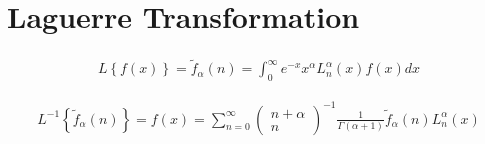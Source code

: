 %
%
%
\section{Laguerre Transformation
\label{laguerre:section:transformation}}
\begin{align}
    L \left\{ f(x) \right\}
    =
    \tilde{f}_\alpha(n)
    =
    \int_0^\infty e^{-x} x^\alpha L_n^\alpha(x) f(x) dx
    \label{laguerre:transformation}
\end{align}

\begin{align}
    L^{-1} \left\{ \tilde{f}_\alpha(n) \right\}
    =
    f(x)
    =
    \sum_{n=0}^{\infty} 
    \begin{pmatrix}
        n + \alpha \\
        n
    \end{pmatrix}^{-1}
    \frac{1}{\Gamma(\alpha + 1)}
    \tilde{f}_\alpha(n)
    L_n^\alpha(x)
    \label{laguerre:inverse_transformation}
\end{align}